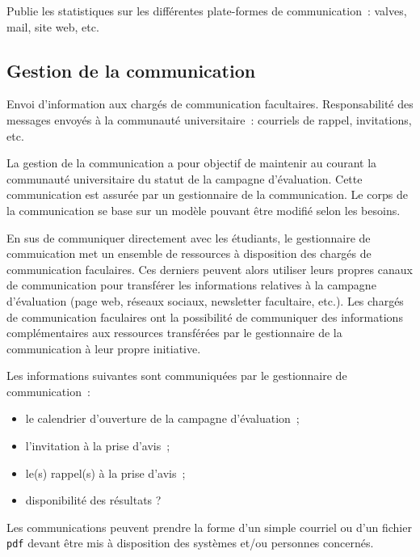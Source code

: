 \documentclass[a4paper,11pt]{report}
\begin{document}
Publie les statistiques sur les différentes plate-formes de communication~: valves, mail, site web, etc.




\subsection{Gestion de la communication}

Envoi d'information aux chargés de communication facultaires.
Responsabilité des messages envoyés à la communauté universitaire~: courriels de rappel, invitations, etc.

La gestion de la communication a pour objectif de maintenir au courant la communauté universitaire du statut de la campagne d'évaluation.
Cette communication est assurée par un gestionnaire de la communication.
Le corps de la communication se base sur un modèle pouvant être modifié selon les besoins.

En sus de communiquer directement avec les étudiants, le gestionnaire de commuication met un ensemble de ressources à disposition des chargés de communication faculaires.
Ces derniers peuvent alors utiliser leurs propres canaux de communication pour transférer les informations relatives à la campagne d'évaluation (page web, réseaux sociaux, newsletter facultaire, etc.).
Les chargés de communication faculaires ont la possibilité de communiquer des informations complémentaires aux ressources transférées par le gestionnaire de la communication à leur propre initiative.

\noindent Les informations suivantes sont communiquées par le gestionnaire de communication~:
\begin{itemize}
	\item le calendrier d'ouverture de la campagne d'évaluation~;
	\item l'invitation à la prise d'avis~;
	\item le(s) rappel(s) à la prise d'avis~;
	\item disponibilité des résultats ?
\end{itemize}

Les communications peuvent prendre la forme d'un simple courriel ou d'un fichier \texttt{pdf} devant être mis à disposition des systèmes et/ou personnes concernés.
\end{document}
